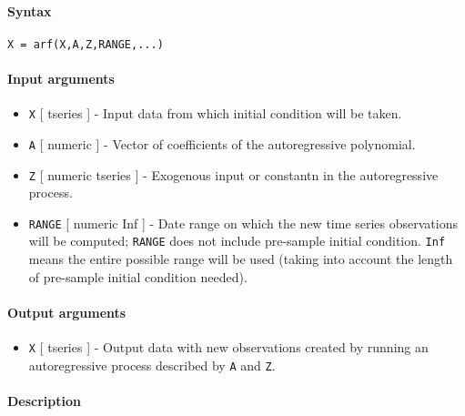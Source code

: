 


	\paragraph{Syntax}\label{syntax}

\begin{verbatim}
X = arf(X,A,Z,RANGE,...)
\end{verbatim}

\paragraph{Input arguments}\label{input-arguments}

\begin{itemize}
\item
  \texttt{X} {[} tseries {]} - Input data from which initial condition
  will be taken.
\item
  \texttt{A} {[} numeric {]} - Vector of coefficients of the
  autoregressive polynomial.
\item
  \texttt{Z} {[} numeric \textbar{} tseries {]} - Exogenous input or
  constantn in the autoregressive process.
\item
  \texttt{RANGE} {[} numeric \textbar{} Inf {]} - Date range on which
  the new time series observations will be computed; \texttt{RANGE} does
  not include pre-sample initial condition. \texttt{Inf} means the
  entire possible range will be used (taking into account the length of
  pre-sample initial condition needed).
\end{itemize}

\paragraph{Output arguments}\label{output-arguments}

\begin{itemize}
\itemsep1pt\parskip0pt
\item
  \texttt{X} {[} tseries {]} - Output data with new observations created
  by running an autoregressive process described by \texttt{A} and
  \texttt{Z}.
\end{itemize}

\paragraph{Description}\label{description}

